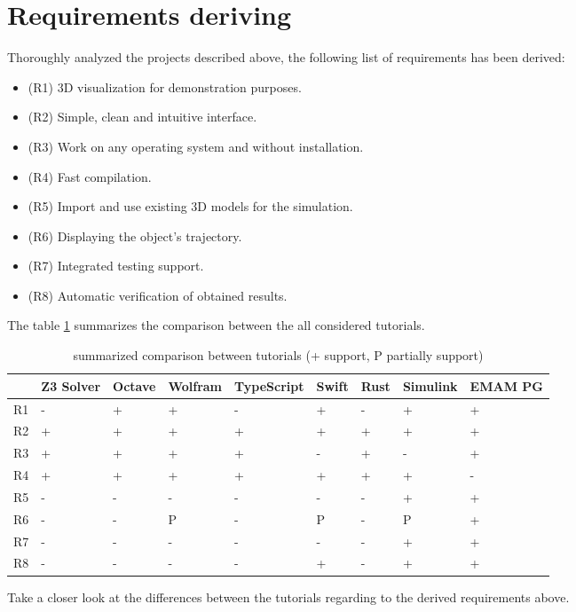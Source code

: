 \section{Requirements deriving}
Thoroughly analyzed the projects described above, the following list of requirements has been derived: \newline 
\begin{itemize}
    \item (R1) 3D visualization for demonstration purposes.
    \item (R2) Simple, clean and intuitive interface.
    \item (R3) Work on any operating system and without installation.
    \item (R4) Fast compilation.
    \item (R5) Import and use existing 3D models for the simulation.
    \item (R6) Displaying the object's trajectory.
    \item (R7) Integrated testing support.
    \item (R8) Automatic verification of obtained results.
\end{itemize}
The table \ref{comparison} summarizes the comparison between the all considered tutorials. \newline
\begin{table}[h!] \caption{summarized comparison between tutorials (+ support, P partially support)} \label{comparison}
    \begin{tabular}{|l|l|l|l|l|l|l|l|l|} 
    \hline
    &  Z3 Solver & Octave & Wolfram & TypeScript & Swift & Rust & Simulink & EMAM PG \\ \hline
    R1 & - & + & + & - & + & - & + & + \\ \hline
    R2 & + & + & + & + & + & + & + & + \\ \hline
    R3 & + & + & + & + & - & + & - & + \\ \hline
    R4 & + & + & + & + & + & + & + & - \\ \hline
    R5 & - & - & - & - & - & - & + & + \\ \hline
    R6 & - & - & P & - & P & - & P & + \\ \hline
    R7 & - & - & - & - & - & - & + & + \\ \hline
    R8 & - & - & - & - & + & - & + & + \\ \hline
    \end{tabular}
\end{table}
Take a closer look at the differences between the tutorials regarding to the derived requirements above. \newline
